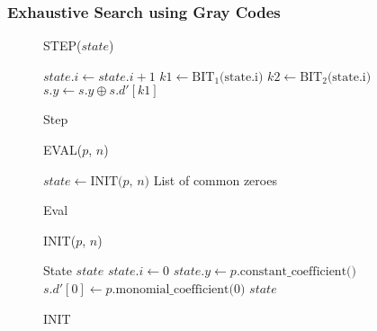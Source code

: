 \subsubsection{Exhaustive Search using Gray Codes} \label{sec:prereq:fes:exh_g_code}

\begin{figure}
    \begin{minipage}[t]{.5\linewidth}
        \begin{alg}
            \caption{STEP($state$)}\label{alg:fes_step}
            $state.i \gets state.i + 1$\;
            $k1 \gets \text{BIT}_1\text{(state.i)}$\;
            $k2 \gets \text{BIT}_2\text{(state.i)}$\;
            $s.y \gets s.y \oplus s.d'[k1]$\;
        \end{alg}
        \caption{Step}
        \label{sec2:alg:fes_step}
    \end{minipage}
    \begin{minipage}[t]{.5\linewidth}
        \begin{alg}
            \caption{EVAL($p$, $n$)}\label{alg:fes_eval}
            $state \gets \text{INIT($p$, $n$)}$\;
            \Return List of common zeroes
        \end{alg}
        \caption{Eval}
        \label{sec2:alg:fes_eval}
    \end{minipage}
    \begin{minipage}[H]{\linewidth}
        \begin{alg}
            \caption{INIT($p$, $n$)}\label{alg:fes_init}
            State $state$\;
            $state.i \gets 0$\;
            $state.y \gets p.\text{constant\_coefficient()}$\;
            $s.d'[0] \gets p.\text{monomial\_coefficient(0)}$\;
            \Return $state$\;
        \end{alg}
        \label{sec2:alg:fes_init}
    \end{minipage}
    \caption{INIT}
    \label{fig:fes_subparts}
\end{figure}


